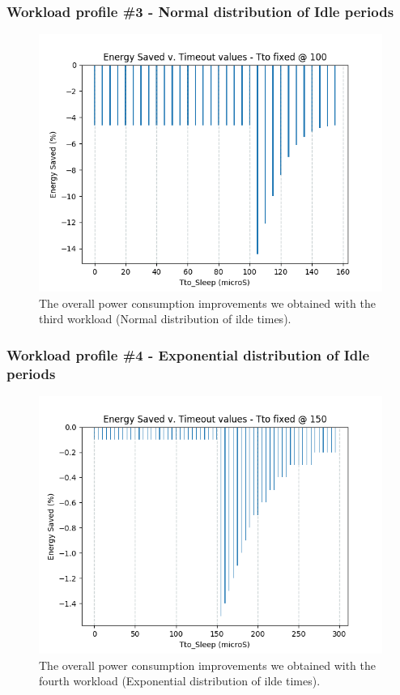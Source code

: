 \documentclass[a4paper]{article}
\begin{document}
        \subsubsection{Workload profile \#3 - Normal distribution of Idle periods}
        \begin{figure}[htp]
            \centering
            \includegraphics[width=0.6 \columnwidth]{./screenshots/Sleep_case3.png}
            \caption{
                    \label{fig:Sleep_case3}
                    The overall power consumption improvements we obtained with the third workload (Normal distribution of ilde times).
            }
        \end{figure}

        \subsubsection{Workload profile \#4 - Exponential distribution of Idle periods}
        \begin{figure}[htp]
            \centering
            \includegraphics[width=0.6 \columnwidth]{./screenshots/Sleep_case4.png}
            \caption{
                    \label{fig:Sleep_case4}
                    The overall power consumption improvements we obtained with the fourth workload (Exponential distribution of ilde times).
            }
        \end{figure}
\end{document}
